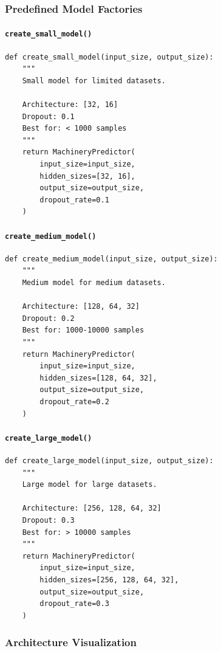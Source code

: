 \documentclass[11pt,a4paper]{article}
\begin{document}
\subsubsection{Predefined Model Factories}

\paragraph{\texttt{create\_small\_model()}}
\begin{lstlisting}
def create_small_model(input_size, output_size):
    """
    Small model for limited datasets.

    Architecture: [32, 16]
    Dropout: 0.1
    Best for: < 1000 samples
    """
    return MachineryPredictor(
        input_size=input_size,
        hidden_sizes=[32, 16],
        output_size=output_size,
        dropout_rate=0.1
    )
\end{lstlisting}

\paragraph{\texttt{create\_medium\_model()}}
\begin{lstlisting}
def create_medium_model(input_size, output_size):
    """
    Medium model for medium datasets.

    Architecture: [128, 64, 32]
    Dropout: 0.2
    Best for: 1000-10000 samples
    """
    return MachineryPredictor(
        input_size=input_size,
        hidden_sizes=[128, 64, 32],
        output_size=output_size,
        dropout_rate=0.2
    )
\end{lstlisting}

\paragraph{\texttt{create\_large\_model()}}
\begin{lstlisting}
def create_large_model(input_size, output_size):
    """
    Large model for large datasets.

    Architecture: [256, 128, 64, 32]
    Dropout: 0.3
    Best for: > 10000 samples
    """
    return MachineryPredictor(
        input_size=input_size,
        hidden_sizes=[256, 128, 64, 32],
        output_size=output_size,
        dropout_rate=0.3
    )
\end{lstlisting}

\subsubsection{Architecture Visualization}
\end{document}
